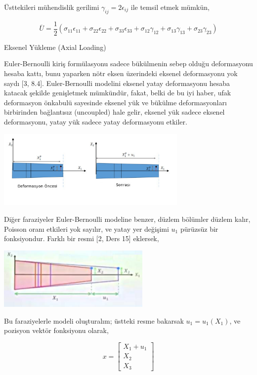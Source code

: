 \documentclass[12pt,fleqn]{article}\usepackage{../../common}
\begin{document}
Üsttekileri mühendislik gerilimi $\gamma_{ij} = 2 \epsilon_{ij}$ ile temsil
etmek mümkün,

$$
\overline{U} = \frac{1}{2} (\sigma_{11}\epsilon_{11} + \sigma_{22}\epsilon_{22}  +
\sigma_{33}\epsilon_{33} + \sigma_{12}\gamma_{12} +
\sigma_{13}\gamma_{13} + \sigma_{23}\gamma_{23} )
$$
 
Eksenel Yükleme (Axial Loading)

Euler-Bernoulli kiriş formülasyonu sadece bükülmenin sebep olduğu deformasyonu
hesaba kattı, bunu yaparken nötr eksen üzerindeki eksenel deformasyonu yok saydı
[3, 8.4]. Euler-Bernoulli modelini eksenel yatay deformasyonu hesaba katacak
şekilde genişletmek mümkündür, fakat, belki de bu iyi haber, ufak deformasyon
önkabulü sayesinde eksenel yük ve bükülme deformasyonları birbirinden
bağlantısız (uncoupled) hale gelir, eksenel yük sadece eksenel deformasyonu,
yatay yük sadece yatay deformasyonu etkiler.

\includegraphics[width=25em]{phy_020_strs_04_06.jpg}

Diğer faraziyeler Euler-Bernoulli modeline benzer, düzlem bölümler düzlem kalır,
Poisson oranı etkileri yok sayılır, ve yatay yer değişimi $u_1$ pürüzsüz bir
fonksiyondur. Farklı bir resmi [2, Ders 15] eklersek,

\includegraphics[width=20em]{phy_020_strs_04_08.jpg}

Bu faraziyelerle modeli oluşturalım; üstteki resme bakarsak $u_1 = u_1(X_1)$, ve
pozisyon vektör fonksiyonu olarak,

$$
x = \left[\begin{array}{c}
X_1 + u_1 \\ X_2 \\ X_3
\end{array}\right]
$$
\end{document}
